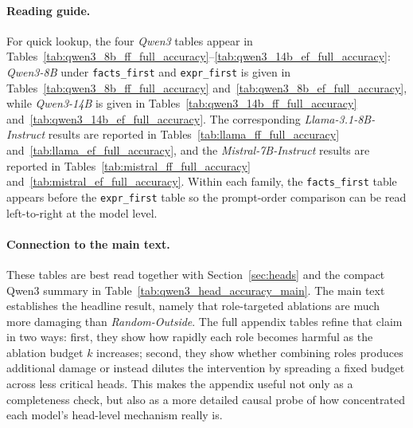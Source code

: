 \documentclass[11pt]{article}
\begin{document}
\paragraph{Reading guide.}
For quick lookup, the four \textit{Qwen3} tables appear in Tables~\ref{tab:qwen3_8b_ff_full_accuracy}--\ref{tab:qwen3_14b_ef_full_accuracy}: \textit{Qwen3-8B} under \texttt{facts\_first} and \texttt{expr\_first} is given in Tables~\ref{tab:qwen3_8b_ff_full_accuracy} and~\ref{tab:qwen3_8b_ef_full_accuracy}, while \textit{Qwen3-14B} is given in Tables~\ref{tab:qwen3_14b_ff_full_accuracy} and~\ref{tab:qwen3_14b_ef_full_accuracy}. The corresponding \textit{Llama-3.1-8B-Instruct} results are reported in Tables~\ref{tab:llama_ff_full_accuracy} and~\ref{tab:llama_ef_full_accuracy}, and the \textit{Mistral-7B-Instruct} results are reported in Tables~\ref{tab:mistral_ff_full_accuracy} and~\ref{tab:mistral_ef_full_accuracy}. Within each family, the \texttt{facts\_first} table appears before the \texttt{expr\_first} table so the prompt-order comparison can be read left-to-right at the model level.

\paragraph{Connection to the main text.}
These tables are best read together with Section~\ref{sec:heads} and the compact Qwen3 summary in Table~\ref{tab:qwen3_head_accuracy_main}. The main text establishes the headline result, namely that role-targeted ablations are much more damaging than \textit{Random-Outside}. The full appendix tables refine that claim in two ways: first, they show how rapidly each role becomes harmful as the ablation budget $k$ increases; second, they show whether combining roles produces additional damage or instead dilutes the intervention by spreading a fixed budget across less critical heads. This makes the appendix useful not only as a completeness check, but also as a more detailed causal probe of how concentrated each model's head-level mechanism really is.
\end{document}
